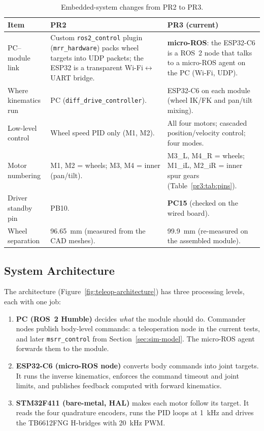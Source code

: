 \documentclass[12pt,a4paper]{article}
\begin{document}
\begin{table}[H]
\centering
\caption{Embedded-system changes from PR2 to PR3.}
\label{pr3:tab:changes}
\small
\begin{tabularx}{\linewidth}{>{\raggedright\arraybackslash}p{3.0cm} >{\raggedright\arraybackslash}X >{\raggedright\arraybackslash}X}
\toprule
Item & PR2 & PR3 (current) \\
\midrule
PC--module link &
  Custom \texttt{ros2\_control} plugin (\texttt{mrr\_hardware}) packs wheel targets into UDP packets;
  the ESP32 is a transparent Wi-Fi$\leftrightarrow$UART bridge. &
  \textbf{micro-ROS}: the ESP32-C6 is a ROS~2 node that talks to a micro-ROS agent on the PC
  (Wi-Fi, UDP). \\
Where kinematics run &
  PC (\texttt{diff\_drive\_controller}). &
  ESP32-C6 on each module (wheel IK/FK and pan/tilt mixing). \\
Low-level control &
  Wheel speed PID only (M1, M2). &
  All four motors; cascaded position/velocity control; four modes. \\
Motor numbering &
  M1, M2 = wheels; M3, M4 = inner (pan/tilt). &
  M3\_L, M4\_R = wheels; M1\_iL, M2\_iR = inner spur gears (Table~\ref{pr3:tab:pins}). \\
Driver standby pin &
  PB10. &
  \textbf{PC15} (checked on the wired board). \\
Wheel separation &
  \SI{96.65}{mm} (measured from the CAD meshes). &
  \SI{99.9}{mm} (re-measured on the assembled module). \\
\bottomrule
\end{tabularx}
\end{table}

\subsection{System Architecture}

The architecture (Figure~\ref{fig:teleop-architecture}) has three processing levels,
each with one job:

\begin{enumerate}
  \item \textbf{PC (ROS~2 Humble)} decides \emph{what} the module should do. Commander
        nodes publish body-level commands: a teleoperation node in the current tests, and
        later \texttt{msrr\_control} from Section~\ref{sec:sim-model}. The micro-ROS agent forwards them to the module.
  \item \textbf{ESP32-C6 (micro-ROS node)} converts body commands into joint targets.
        It runs the inverse kinematics, enforces the command timeout and joint limits,
        and publishes feedback computed with forward kinematics.
  \item \textbf{STM32F411 (bare-metal, HAL)} makes each motor follow its target. It
        reads the four quadrature encoders, runs the PID loops at \SI{1}{kHz} and
        drives the TB6612FNG H-bridges with \SI{20}{kHz} PWM.
\end{enumerate}
\end{document}
